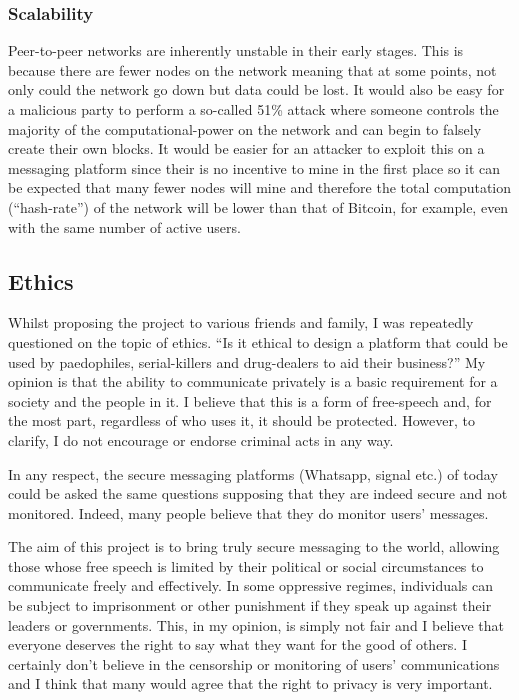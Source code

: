 \documentclass{article}
\begin{document}
\subsubsection{Scalability}
Peer-to-peer networks are inherently unstable in their early stages. This is because there are fewer nodes on the network meaning that at some points, not only could the network go down but data could be lost. It would also be easy for a malicious party to perform a so-called 51\% attack where someone controls the majority of the computational-power on the network and can begin to falsely create their own blocks. It would be easier for an attacker to exploit this on a messaging platform since their is no incentive to mine in the first place so it can be expected that many fewer nodes will mine and therefore the total computation (``hash-rate'') of the network will be lower than that of Bitcoin, for example, even with the same number of active users.

\newpage

\subsection{Ethics} \label{subsec:ethics}
Whilst proposing the project to various friends and family, I was repeatedly questioned on the topic of ethics. ``Is it ethical to design a platform that could be used by paedophiles, serial-killers and drug-dealers to aid their business?'' My opinion is that the ability to communicate privately is a basic requirement for a society and the people in it. I believe that this is a form of free-speech and, for the most part, regardless of who uses it, it should be protected. However, to clarify, I do not encourage or endorse criminal acts in any way.

In any respect, the secure messaging platforms (Whatsapp, signal etc.) of today could be asked the same questions supposing that they are indeed secure and not monitored. Indeed, many people believe that they do monitor users' messages\cite{whatsapp_endtoend}\cite{facebook_nsa}\cite{fbmsg_nsa_criminal}.

The aim of this project is to bring truly secure messaging to the world, allowing those whose free speech is limited by their political or social circumstances to communicate freely and effectively. In some oppressive regimes, individuals can be subject to imprisonment or other punishment if they speak up against their leaders or governments. This, in my opinion, is simply not fair and I believe that everyone deserves the right to say what they want for the good of others. I certainly don't believe in the censorship or monitoring of users' communications and I think that many would agree that the right to privacy is very important.
\end{document}
